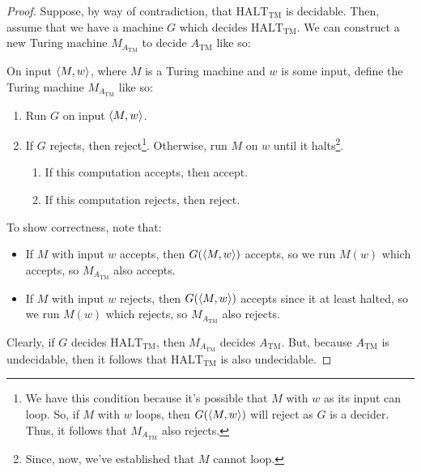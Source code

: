 \documentclass[letterpaper]{article}
\begin{document}
\begin{mdframed}[]
    \begin{proof}
        Suppose, by way of contradiction, that $\text{HALT}_{\text{TM}}$ is decidable. Then, assume that we have a machine $G$ which decides $\text{HALT}_{\text{TM}}$. We can construct a new Turing machine $M_{A_{\text{TM}}}$ to decide $A_{\text{TM}}$ like so: 
        \begin{mdframed}[]
            On input $\langle M, w \rangle$, where $M$ is a Turing machine and $w$ is some input, define the Turing machine $M_{A_{\text{TM}}}$ like so:
            \begin{enumerate}
                \item Run $G$ on input $\langle M, w \rangle$. 
                \item If $G$ rejects, then reject\footnote{We have this condition because it's possible that $M$ with $w$ as its input can loop. So, if $M$ with $w$ loops, then $G(\langle M, w \rangle)$ will reject as $G$ is a decider. Thus, it follows that $M_{A_{\text{TM}}}$ also rejects.}. Otherwise, run $M$ on $w$ until it halts\footnote{Since, now, we've established that $M$ cannot loop.}. 
                \begin{enumerate}
                    \item If this computation accepts, then accept. 
                    \item If this computation rejects, then reject. 
                \end{enumerate}
            \end{enumerate}
        \end{mdframed}
        To show correctness, note that: 
        \begin{itemize}
            \item If $M$ with input $w$ accepts, then $G(\langle M, w \rangle)$ accepts, so we run $M(w)$ which accepts, so $M_{A_{\text{TM}}}$ also accepts.
            \item If $M$ with input $w$ rejects, then $G(\langle M, w \rangle)$ accepts since it at least halted, so we run $M(w)$ which rejects, so $M_{A_{\text{TM}}}$ also rejects.
        \end{itemize}
        Clearly, if $G$ decides $\text{HALT}_{\text{TM}}$, then $M_{A_\text{TM}}$ decides $A_{\text{TM}}$. But, because $A_{\text{TM}}$ is undecidable, then it follows that $\text{HALT}_{\text{TM}}$ is also undecidable. 
    \end{proof}
\end{mdframed}
\end{document}
